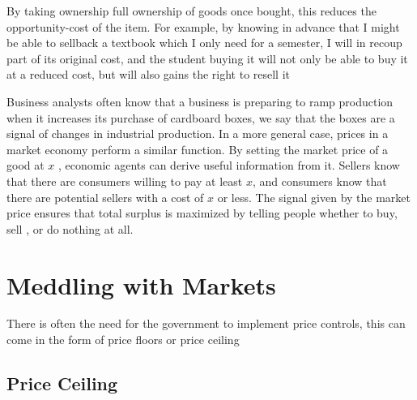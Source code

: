 \documentclass[english,course,draft]{Notes}
\begin{document}
\par{By taking ownership full ownership of goods once bought, this reduces the opportunity-cost of the item. For example, by knowing in advance that I might be able to sellback a textbook which I only need for a semester, I will in recoup part of its original cost, and the student buying it will not only be able to buy it at a reduced cost, but will also gains the right to resell it} 


\par{Business analysts often know that a business is preparing to ramp production when it increases its purchase of cardboard boxes, we say that the boxes are a signal of changes in industrial production. In a more general case, prices in a market economy perform a similar function. By setting the market price of a good at $x$ , economic agents can derive useful information from  it. Sellers know that there are consumers willing to pay at least $x$, and consumers know that there are potential sellers with a cost of $x$ or less. The signal given by the market price ensures that total surplus is maximized by telling people whether to buy, sell , or do nothing at all.}



\section{Meddling with Markets}


\par{There is often the need for the government to implement price controls, this can come in the form of price floors or price ceiling}

\subsection{Price Ceiling}

\end{document}
